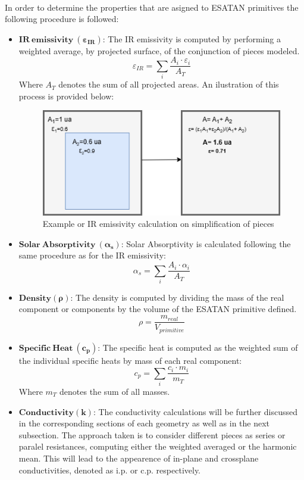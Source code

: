 \paragraph{}
In order to determine the properties that are asigned to ESATAN primitives the following
procedure is followed:
\begin{itemize}
    \item $\mathbf{IR\ emissivity\ (\varepsilon_{IR})}$: The IR emissivity is computed by 
    performing a weighted average, by projected surface, of the conjunction of pieces modeled.
    \begin{equation}
        \varepsilon_{IR}=\sum_{i}\frac{A_i\cdot\varepsilon_i}{A_T}
    \end{equation}
    Where $A_T$ denotes the sum of all projected areas.
    An ilustration of this process is provided below:
    \begin{figure}[H]
        \centering
        \includegraphics[width=0.5\linewidth]{res/img/5_simulationanalisys/AreasWeighted.drawio.png}
        \caption{Example or IR emissivity calculation on simplification of pieces}
        \label{fig:areaexample}
    \end{figure}
    \item $\mathbf{Solar\ Absorptivity\ (\alpha_s)}$: Solar Absorptivity is calculated following
    the same procedure as for the IR emissivity:
    \begin{equation}
        \alpha_s=\sum_{i}\frac{A_i\cdot\alpha_i}{A_T}
    \end{equation}
    \item $\mathbf{Density(\rho)}$: The density is computed by dividing the mass of the real
    component or components by the volume of the ESATAN primitive defined.
    \begin{equation}
        \rho=\frac{m_{real}}{V_{primitive}}
    \end{equation}
    \item $\mathbf{Specific\ Heat\ (c_{p})}$: The specific heat is computed as the weighted sum
    of the individual specific heats by mass of each real component:
    \begin{equation}
        c_p=\sum_i \frac{c_i \cdot m_i}{m_T}
    \end{equation}
    Where $m_T$ denotes the sum of all masses.
    \item $\mathbf{Conductivity (k)}$: The conductivity calculations will be further discussed in
    the corresponding sections of each geometry as well as in the next subsection. The approach taken is to consider different pieces
    as series or paralel resistances, computing either the weighted averaged or the harmonic mean.
    This will lead to the appearence of in-plane and crossplane conductivities, denoted as i.p. or 
    c.p. respectively.
\end{itemize}

